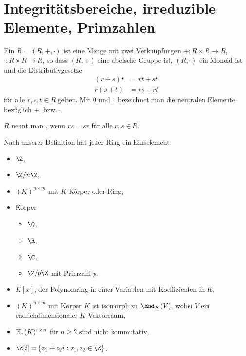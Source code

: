 \chapter{Integritätsbereiche, irreduzible Elemente, Primzahlen}


\begin{df}
	Ein  $R = (R, +, \cdot)$ ist eine Menge mit zwei Verknüpfungen $+: R \times R \to R$, $\cdot: R \times R \to R$, so dass $(R, +)$ eine abelsche Gruppe ist, $(R, \cdot)$ ein Monoid ist und die Distributivgesetze
	\begin{align*}
		(r+s)t &= rt + st \\
		r(s+t) &= rs + rt
	\end{align*}
	für alle $r, s, t \in R$ gelten.
	Mit $0$ und $1$ bezeichnet man die neutralen Elemente bezüglich $+$, bzw. $\cdot$.

	$R$ nennt man , wenn $rs = sr$ für alle $r,s \in R$.
	\begin{note}
		Nach unserer Definition hat jeder Ring ein Einselement.
	\end{note}
\end{df}

\begin{ex}
	\begin{itemize}
		\item
			$\Z$,
		\item
			$\Z / n \Z$,
		\item
			$(K)^{n\times m}$ mit $K$ Körper oder Ring,
		\item
			Körper
			\begin{itemize}
				\item
					$\Q$,
				\item
					$\R$,
				\item
					$\C$,
				\item
					$\Z / p \Z$ mit Primzahl $p$.
			\end{itemize}
		\item
			$K[x]$, der Polynomring in einer Variablen mit Koeffizienten in $K$,
		\item
			$(K)^{n\times m}$ mit Körper $K$ ist isomorph zu $\End_K(V)$, wobei $V$ ein endlichdimensionaler $K$-Vektorraum,
		\item
			$\mathbb{H}, (K)^{n\times n}$ für $n \ge 2$ sind nicht kommutativ,
		\item
			$\Z[i] = \{ z_1 + z_2 i : z_1, z_2 \in \Z \}$.
	\end{itemize}
\end{ex}

